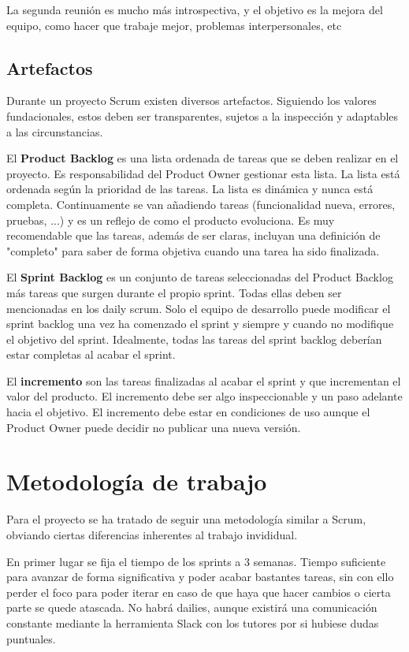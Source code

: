 \documentclass[12pt]{report} %
\begin{document}
La segunda reunión es mucho más introspectiva, y el objetivo es la mejora del equipo, como hacer que trabaje mejor, problemas interpersonales, etc

\subsection{Artefactos}

Durante un proyecto Scrum existen diversos artefactos. Siguiendo los valores fundacionales, estos deben ser transparentes, sujetos a la inspección y adaptables a las circunstancias.

El \textbf{Product Backlog} es una lista ordenada de tareas que se deben realizar en el proyecto. Es responsabilidad del Product Owner gestionar esta lista. La lista está ordenada según la prioridad de las tareas. La lista es dinámica y nunca está completa. Continuamente se van añadiendo tareas (funcionalidad nueva, errores, pruebas, ...) y es un reflejo de como el producto evoluciona. Es muy recomendable que las tareas, además de ser claras, incluyan una definición de "completo" para saber de forma objetiva cuando una tarea ha sido finalizada.

El \textbf{Sprint Backlog} es un conjunto de tareas seleccionadas del Product Backlog más tareas que surgen durante el propio sprint. Todas ellas deben ser mencionadas en los daily scrum. Solo el equipo de desarrollo puede modificar el sprint backlog una vez ha comenzado el sprint y siempre y cuando no modifique el objetivo del sprint. Idealmente, todas las tareas del sprint backlog deberían estar completas al acabar el sprint.

El \textbf{incremento} son las tareas finalizadas al acabar el sprint y que incrementan el valor del producto. El incremento debe ser algo inspeccionable y un paso adelante hacia el objetivo. El incremento debe estar en condiciones de uso aunque el Product Owner puede decidir no publicar una nueva versión.

\section{Metodología de trabajo}
Para el proyecto se ha tratado de seguir una metodología similar a Scrum, obviando ciertas diferencias inherentes al trabajo invididual.

En primer lugar se fija el tiempo de los sprints a 3 semanas. Tiempo suficiente para avanzar de forma significativa y poder acabar bastantes tareas, sin con ello perder el foco para poder iterar en caso de que haya que hacer cambios o cierta parte se quede atascada. No habrá dailies, aunque existirá una comunicación constante mediante la herramienta Slack con los tutores por si hubiese dudas puntuales.
\end{document}

